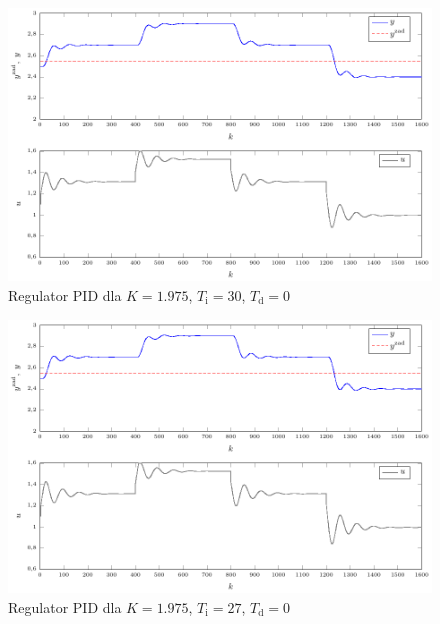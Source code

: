 \begin{figure}[tb] 
\centering 
\includegraphics[scale=1]{rysunki/zapisz_pdf/PID_K=1.975_Ti=30.00_Td=0.00.pdf} 
\caption{Regulator PID dla $K=\num{1.975}$, $T_{\mathrm{i}}=30$, $T_{\mathrm{d}}=0$} 
\label{r_pgfplots_PID_K=1.975_Ti=30.00_Td=0.00} 
\end{figure}

\begin{figure}[tb] 
\centering 
\includegraphics[scale=1]{rysunki/zapisz_pdf/PID_K=1.975_Ti=27.00_Td=0.00.pdf} 
\caption{Regulator PID dla $K=\num{1.975}$, $T_{\mathrm{i}}=27$, $T_{\mathrm{d}}=0$} 
\label{r_pgfplots_PID_K=1.975_Ti=27.00_Td=0.00} 
\end{figure}

